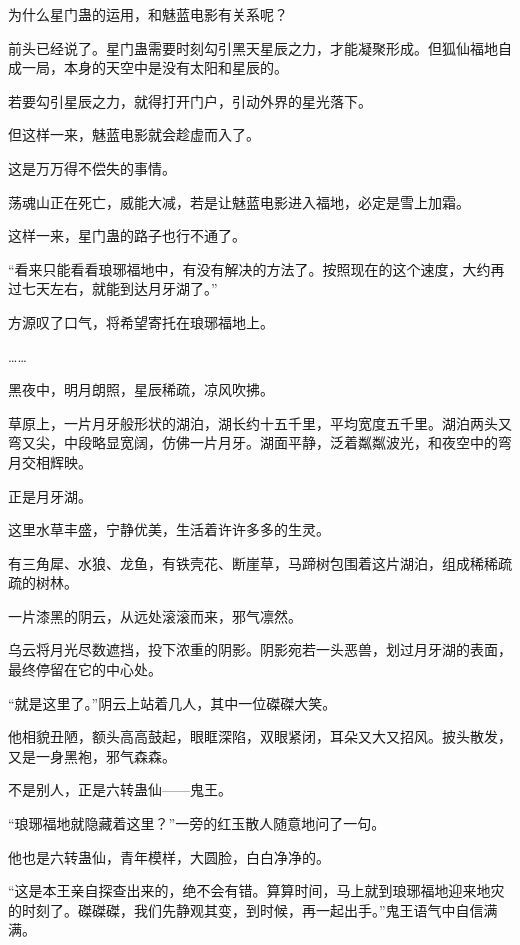 \begin{this_body}
为什么星门蛊的运用，和魅蓝电影有关系呢？

前头已经说了。星门蛊需要时刻勾引黑天星辰之力，才能凝聚形成。但狐仙福地自成一局，本身的天空中是没有太阳和星辰的。

若要勾引星辰之力，就得打开门户，引动外界的星光落下。

但这样一来，魅蓝电影就会趁虚而入了。

这是万万得不偿失的事情。

荡魂山正在死亡，威能大减，若是让魅蓝电影进入福地，必定是雪上加霜。

这样一来，星门蛊的路子也行不通了。

“看来只能看看琅琊福地中，有没有解决的方法了。按照现在的这个速度，大约再过七天左右，就能到达月牙湖了。”

方源叹了口气，将希望寄托在琅琊福地上。

……

黑夜中，明月朗照，星辰稀疏，凉风吹拂。

草原上，一片月牙般形状的湖泊，湖长约十五千里，平均宽度五千里。湖泊两头又弯又尖，中段略显宽阔，仿佛一片月牙。湖面平静，泛着粼粼波光，和夜空中的弯月交相辉映。

正是月牙湖。

这里水草丰盛，宁静优美，生活着许许多多的生灵。

有三角犀、水狼、龙鱼，有铁壳花、断崖草，马蹄树包围着这片湖泊，组成稀稀疏疏的树林。

一片漆黑的阴云，从远处滚滚而来，邪气凛然。

乌云将月光尽数遮挡，投下浓重的阴影。阴影宛若一头恶兽，划过月牙湖的表面，最终停留在它的中心处。

“就是这里了。”阴云上站着几人，其中一位磔磔大笑。

他相貌丑陋，额头高高鼓起，眼眶深陷，双眼紧闭，耳朵又大又招风。披头散发，又是一身黑袍，邪气森森。

不是别人，正是六转蛊仙——鬼王。

“琅琊福地就隐藏着这里？”一旁的红玉散人随意地问了一句。

他也是六转蛊仙，青年模样，大圆脸，白白净净的。

“这是本王亲自探查出来的，绝不会有错。算算时间，马上就到琅琊福地迎来地灾的时刻了。磔磔磔，我们先静观其变，到时候，再一起出手。”鬼王语气中自信满满。

\end{this_body}

